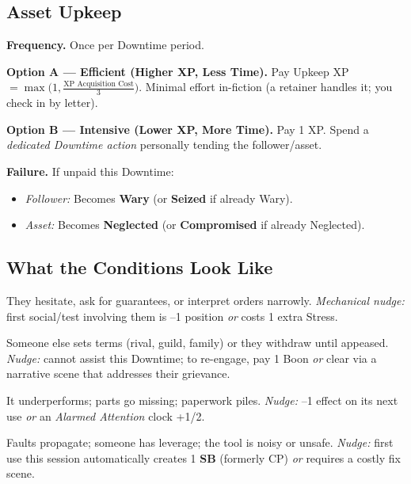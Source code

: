 \subsection{Asset Upkeep}\label{subsec:upkeep-core}
\textbf{Frequency.} Once per Downtime period.\par
\textbf{Option A — Efficient (Higher XP, Less Time).} Pay Upkeep XP $= \max\big(1, \tfrac{\text{XP Acquisition Cost}}{3}\big)$. Minimal effort in-fiction (a retainer handles it; you check in by letter).\par
\textbf{Option B — Intensive (Lower XP, More Time).} Pay 1 XP. Spend a \emph{dedicated Downtime action} personally tending the follower/asset.

\textbf{Failure.} If unpaid this Downtime:
\begin{itemize}
\item \emph{Follower:} Becomes \textbf{Wary} (or \textbf{Seized} if already Wary).
\item \emph{Asset:} Becomes \textbf{Neglected} (or \textbf{Compromised} if already Neglected).
\end{itemize}

\subsection{What the Conditions Look Like}\label{subsec:upkeep-conditions}
\begin{description}[leftmargin=1.6em]
\item[\textsc{Wary} (Follower).] They hesitate, ask for guarantees, or interpret orders narrowly. \emph{Mechanical nudge:} first social/test involving them is --1 position \emph{or} costs 1 extra Stress.
\item[\textsc{Seized} (Follower).] Someone else sets terms (rival, guild, family) or they withdraw until appeased. \emph{Nudge:} cannot assist this Downtime; to re-engage, pay 1 Boon \emph{or} clear via a narrative scene that addresses their grievance.
\item[\textsc{Neglected} (Asset).] It underperforms; parts go missing; paperwork piles. \emph{Nudge:} --1 effect on its next use \emph{or} an \emph{Alarmed Attention} clock +1/2.
\item[\textsc{Compromised} (Asset).] Faults propagate; someone has leverage; the tool is noisy or unsafe. \emph{Nudge:} first use this session automatically creates 1 \textbf{SB} (formerly CP) \emph{or} requires a costly fix scene.
\end{description}

